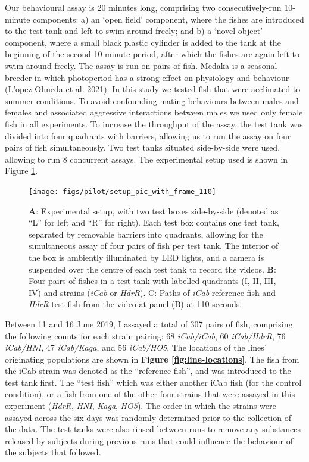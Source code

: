 \documentclass[
]{book}
\begin{document}
Our behavioural assay is 20 minutes long, comprising two consecutively-run 10-minute components: a) an `open field' component, where the fishes are introduced to the test tank and left to swim around freely; and b) a `novel object' component, where a small black plastic cylinder is added to the tank at the beginning of the second 10-minute period, after which the fishes are again left to swim around freely. The assay is run on pairs of fish. Medaka is a seasonal breeder in which photoperiod has a strong effect on physiology and behaviour (L'opez-Olmeda et al. 2021). In this study we tested fish that were acclimated to summer conditions. To avoid confounding mating behaviours between males and females and associated aggressive interactions between males we used only female fish in all experiments. To increase the throughput of the assay, the test tank was divided into four quadrants with barriers, allowing us to run the assay on four pairs of fish simultaneously. Two test tanks situated side-by-side were used, allowing to run 8 concurrent assays. The experimental setup used is shown in Figure \ref{fig:assay-setup}.



\begin{figure}
\texttt{[image: figs/pilot/setup\_pic\_with\_frame\_110]} \caption{\textbf{A}: Experimental setup, with two test boxes side-by-side (denoted as ``L'' for left and ``R'' for right). Each test box contains one test tank, separated by removable barriers into quadrants, allowing for the simultaneous assay of four pairs of fish per test tank. The interior of the box is ambiently illuminated by LED lights, and a camera is suspended over the centre of each test tank to record the videos. \textbf{B}: Four pairs of fishes in a test tank with labelled quadrants (I, II, III, IV) and strains (\emph{iCab} or \emph{HdrR}). C: Paths of \emph{iCab} reference fish and \emph{HdrR} test fish from the video at panel (B) at 110 seconds.}\label{fig:assay-setup}
\end{figure}

Between 11 and 16 June 2019, I assayed a total of 307 pairs of fish, comprising the following counts for each strain pairing: 68 \emph{iCab/iCab}, 60 \emph{iCab/HdrR}, 76 \emph{iCab/HNI}, 47 \emph{iCab/Kaga}, and 56 \emph{iCab/HO5}. The locations of the lines' originating populations are shown in \textbf{Figure \ref{fig:line-locations}}. The fish from the iCab strain was denoted as the ``reference fish'', and was introduced to the test tank first. The ``test fish'' which was either another iCab fish (for the control condition), or a fish from one of the other four strains that were assayed in this experiment (\emph{HdrR}, \emph{HNI}, \emph{Kaga}, \emph{HO5}). The order in which the strains were assayed across the six days was randomly determined prior to the collection of the data. The test tanks were also rinsed between runs to remove any substances released by subjects during previous runs that could influence the behaviour of the subjects that followed.
\end{document}
